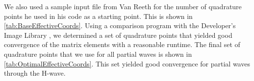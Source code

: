 \documentclass[Dissertation.tex]{subfiles}
\begin{document}
We also used a sample input file from Van Reeth \cite{VanReethPrivate} for
the number of quadrature points he used in his code as a starting point.
This is shown in \cref{tab:BaseEffectiveCoords}.
Using a comparison program with the Developer's Image Library \cite{DevIL}, we
determined a set of quadrature points that yielded good convergence of
the matrix elements with a reasonable runtime. The final set of quadrature
points that we use for all partial waves is shown in
\cref{tab:OptimalEffectiveCoords}. This set yielded good convergence for
partial waves through the H-wave.

%
%
%
\end{document}
